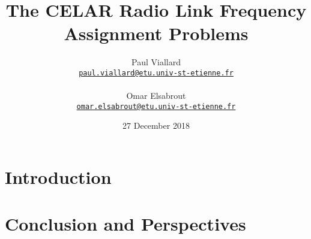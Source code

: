 \documentclass{article}
\title{The CELAR Radio Link Frequency Assignment Problems}
\author{Paul Viallard\\
  \texttt{\href{mailto:paul.viallard@etu.univ-st-etienne.fr}{paul.viallard@etu.univ-st-etienne.fr}} 
\\\\ Omar Elsabrout\\
\texttt{\href{mailto:omar.elsabrout@etu.univ-st-etienne.fr}{omar.elsabrout@etu.univ-st-etienne.fr}}}
\date{27 December 2018}
\begin{document}
  \maketitle

	\begin{abstract}
	
	\end{abstract}
	
	\section{Introduction}

	\section{Conclusion and Perspectives}
	\newpage
	
\end{document}
